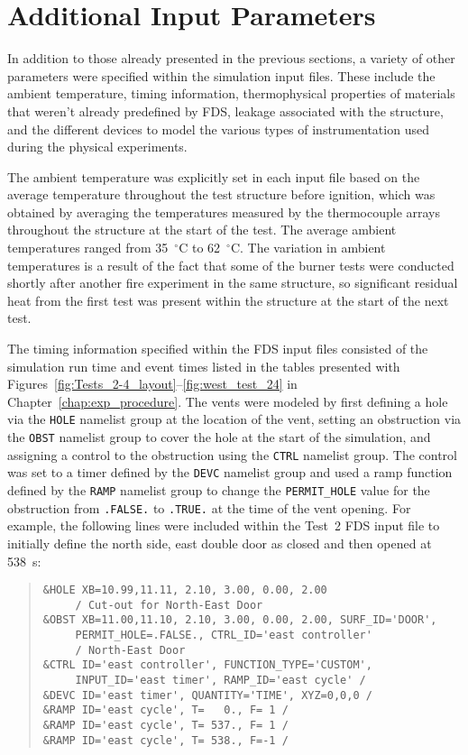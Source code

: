 \FloatBarrier
\section{Additional Input Parameters}
In addition to those already presented in the previous sections, a variety of other parameters were specified within the simulation input files. These include the ambient temperature, timing information, thermophysical properties of materials that weren't already predefined by FDS, leakage associated with the structure, and the different devices to model the various types of instrumentation used during the physical experiments.

The ambient temperature was explicitly set in each input file based on the average temperature throughout the test structure before ignition, which was obtained by averaging the temperatures measured by the thermocouple arrays throughout the structure at the start of the test. The average ambient temperatures ranged from 35~$^\circ$C to 62~$^\circ$C. The variation in ambient temperatures is a result of the fact that some of the burner tests were conducted shortly after another fire experiment in the same structure, so significant residual heat from the first test was present within the structure at the start of the next test.

The timing information specified within the FDS input files consisted of the simulation run time and event times listed in the tables presented with Figures~\ref{fig:Tests_2-4_layout}--\ref{fig:west_test_24} in Chapter~\ref{chap:exp_procedure}. The vents were modeled by first defining a hole via the \verb|HOLE| namelist group at the location of the vent, setting an obstruction via the \verb|OBST| namelist group to cover the hole at the start of the simulation, and assigning a control to the obstruction using the \verb|CTRL| namelist group. The control was set to a timer defined by the \verb|DEVC| namelist group and used a ramp function defined by the \verb|RAMP| namelist group to change the \verb|PERMIT_HOLE| value for the obstruction from \verb|.FALSE.| to \verb|.TRUE.| at the time of the vent opening. For example, the following lines were included within the Test~2 FDS input file to initially define the north side, east double door as closed and then opened at 538~s:
\begin{quote}
\begin{verbatim}
&HOLE XB=10.99,11.11, 2.10, 3.00, 0.00, 2.00 
     / Cut-out for North-East Door
&OBST XB=11.00,11.10, 2.10, 3.00, 0.00, 2.00, SURF_ID='DOOR', 
     PERMIT_HOLE=.FALSE., CTRL_ID='east controller' 
     / North-East Door
&CTRL ID='east controller', FUNCTION_TYPE='CUSTOM', 
     INPUT_ID='east timer', RAMP_ID='east cycle' /
&DEVC ID='east timer', QUANTITY='TIME', XYZ=0,0,0 /
&RAMP ID='east cycle', T=   0., F= 1 /
&RAMP ID='east cycle', T= 537., F= 1 /
&RAMP ID='east cycle', T= 538., F=-1 /
\end{verbatim}
\end{quote}

